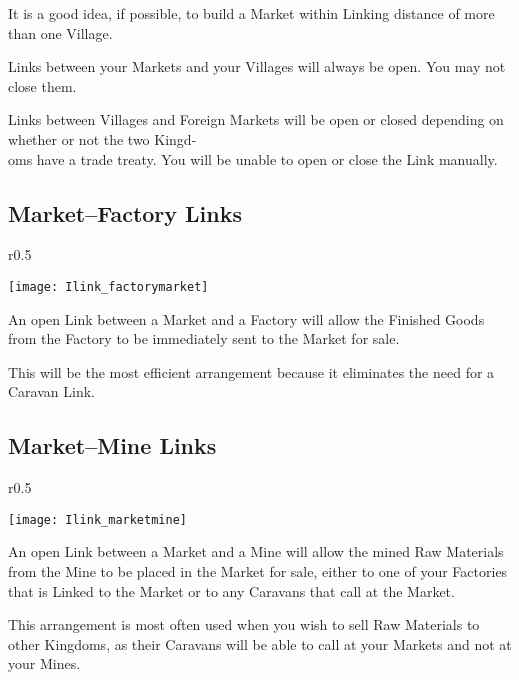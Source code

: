It is a good idea, if possible, to build a Market within Linking distance of more than one Village.

Links between your Markets and your Villages will always be open. You may not close them.

Links between Villages and Foreign Markets will be open or closed depending on whether or not the two Kingd-\\
oms have a trade treaty. You will be unable to open or close the Link manually.

\subsection{Market–Factory Links}

\begin{wrapfigure}{r}{0.5\textwidth}
	\vspace{-20pt}
	\begin{center}
		\texttt{[image: Ilink\_factorymarket]}
	\end{center}
	\vspace{-15pt}
\end{wrapfigure}

An open Link between a Market and a Factory will allow the Finished Goods from the Factory to be immediately sent to the Market for sale.

This will be the most efficient arrangement because it eliminates the need for a Caravan Link.

\subsection{Market–Mine Links}

\begin{wrapfigure}{r}{0.5\textwidth}
	\vspace{-20pt}
	\begin{center}
		\texttt{[image: Ilink\_marketmine]}
	\end{center}
	\vspace{-10pt}
\end{wrapfigure}

An open Link between a Market and a Mine will allow the mined Raw Materials from the Mine to be placed in the Market for sale, either to one of your Factories that is Linked to the Market or to any Caravans that call at the Market.

This arrangement is most often used when you wish to sell Raw Materials to other Kingdoms, as their Caravans will be able to call at your Markets and not at your Mines.

